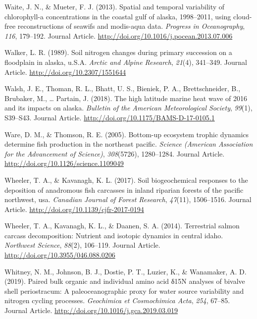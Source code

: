 \documentclass [11pt, proquest] {uwthesis}[2015/03/03]
\begin{document}
\hypertarget{ref-Waite2013}{}
Waite, J. N., \& Mueter, F. J. (2013). Spatial and temporal variability
of chlorophyll-a concentrations in the coastal gulf of alaska,
1998--2011, using cloud-free reconstructions of seawifs and modis-aqua
data. \emph{Progress in Oceanography}, \emph{116}, 179--192. Journal
Article. \url{http://doi.org/10.1016/j.pocean.2013.07.006}

\hypertarget{ref-Walker1989}{}
Walker, L. R. (1989). Soil nitrogen changes during primary succession on
a floodplain in alaska, u.S.A. \emph{Arctic and Alpine Research},
\emph{21}(4), 341--349. Journal Article.
\url{http://doi.org/10.2307/1551644}

\hypertarget{ref-Walsh2018}{}
Walsh, J. E., Thoman, R. L., Bhatt, U. S., Bieniek, P. A.,
Brettschneider, B., Brubaker, M., \ldots{} Partain, J. (2018). The high
latitude marine heat wave of 2016 and its impacts on alaska.
\emph{Bulletin of the American Meteorological Society}, \emph{99}(1),
S39--S43. Journal Article. \url{http://doi.org/10.1175/BAMS-D-17-0105.1}

\hypertarget{ref-Ware2005}{}
Ware, D. M., \& Thomson, R. E. (2005). Bottom-up ecosystem trophic
dynamics determine fish production in the northeast pacific.
\emph{Science (American Association for the Advancement of Science)},
\emph{308}(5726), 1280--1284. Journal Article.
\url{http://doi.org/10.1126/science.1109049}

\hypertarget{ref-Wheeler2017}{}
Wheeler, T. A., \& Kavanagh, K. L. (2017). Soil biogeochemical responses
to the deposition of anadromous fish carcasses in inland riparian
forests of the pacific northwest, usa. \emph{Canadian Journal of Forest
Research}, \emph{47}(11), 1506--1516. Journal Article.
\url{http://doi.org/10.1139/cjfr-2017-0194}

\hypertarget{ref-Wheeler2014}{}
Wheeler, T. A., Kavanagh, K. L., \& Daanen, S. A. (2014). Terrestrial
salmon carcass decomposition: Nutrient and isotopic dynamics in central
idaho. \emph{Northwest Science}, \emph{88}(2), 106--119. Journal
Article. \url{http://doi.org/10.3955/046.088.0206}

\hypertarget{ref-Whitney2019}{}
Whitney, N. M., Johnson, B. J., Dostie, P. T., Luzier, K., \& Wanamaker,
A. D. (2019). Paired bulk organic and individual amino acid δ15N
analyses of bivalve shell periostracum: A paleoceanographic proxy for
water source variability and nitrogen cycling processes.
\emph{Geochimica et Cosmochimica Acta}, \emph{254}, 67--85. Journal
Article. \url{http://doi.org/10.1016/j.gca.2019.03.019}
\end{document}
